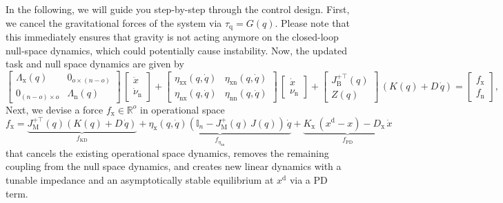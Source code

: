 In the following, we will guide you step-by-step through the control design.
First, we cancel the gravitational forces of the system via $\tau_\mathrm{q} = G(q)$. Please note that this immediately ensures that gravity is not acting anymore on the closed-loop null-space dynamics, which could potentially cause instability.
Now, the updated task and null space dynamics are given by
\begin{equation}
    \begin{bmatrix}
        \Lambda_\mathrm{x}(q) & 0_{o \times (n-o)}\\
        0_{(n-o) \times o} & \Lambda_\mathrm{n}(q)
    \end{bmatrix} \, \begin{bmatrix}
        \ddot{x}\\
        \dot{\nu}_\mathrm{n}
    \end{bmatrix} + \begin{bmatrix}
        \eta_\mathrm{xx}(q,\dot{q}) & \eta_\mathrm{xn}(q,\dot{q})\\
        \eta_\mathrm{nx}(q,\dot{q}) & \eta_\mathrm{nn}(q,\dot{q})
    \end{bmatrix} \, \begin{bmatrix}
        \dot{x}\\ \nu_\mathrm{n}
    \end{bmatrix} + \begin{bmatrix}
        J_\mathrm{B}^{+\top}(q)\\
        Z(q)
    \end{bmatrix} \, \left ( K(q) + D \, \dot{q} \right ) = \begin{bmatrix}
        f_\mathrm{x}\\ f_\mathrm{n}
    \end{bmatrix},
\end{equation}
Next, we devise a force $f_\mathrm{x} \in \mathbb{R}^o$ in operational space
\begin{equation}
    f_\mathrm{x} = \underbrace{J_\mathrm{M}^{+\top}(q) \left ( K(q) + D \, \dot{q} \right )}_{f_\mathrm{KD}}
    + \underbrace{\eta_\mathrm{x}(q,\dot{q}) \left ( \mathbb{I}_n - J_\mathrm{M}^{+}(q) \, J(q)  \right ) \, \dot{q}}_{f_{\eta_\mathrm{xn}}}
    + \underbrace{K_\mathrm{x} \, (x^\mathrm{d} - x) - D_\mathrm{x} \, \dot{x}}_{f_\mathrm{PD}}
\end{equation}
that cancels the existing operational space dynamics, removes the remaining coupling from the null space dynamics, and creates new linear dynamics with a tunable impedance and an asymptotically stable equilibrium at $x^\mathrm{d}$ via a PD term. 
